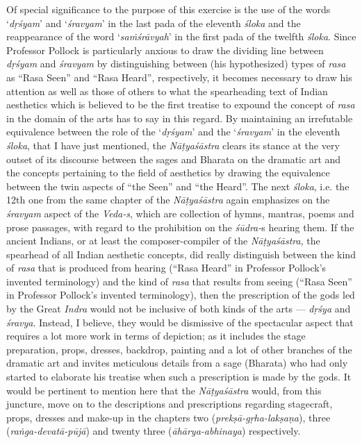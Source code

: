 Of special significance to the purpose of this exercise is the use of the words ‘\textsl{dṛśyam}’ and ‘\textsl{śravyam}’ in the last pada of the eleventh \textsl{śloka} and the reappearance of the word ‘\textsl{saṁśrāvyah}’ in the first pada of the twelfth \textsl{śloka}. Since Professor Pollock is particularly anxious to draw the dividing line between \textsl{dṛśyam} and \textsl{śravyam} by distinguishing between (his hypothesized) types of \textsl{rasa} as “Rasa Seen” and “Rasa Heard”, respectively, it becomes necessary to draw his attention as well as those of others to what the spearheading text of Indian aesthetics which is believed to be the first treatise to expound the concept of \textsl{rasa} in the domain of the arts has to say in this regard. By maintaining an irrefutable equivalence between the role of the ‘\textsl{dṛśyam}’ and the ‘\textsl{śravyam}’ in the eleventh \textsl{śloka}, that I have just mentioned, the \textsl{Nāṭyaśāstra} clears its stance at the very outset of its discourse between the sages and Bharata on the dramatic art and the concepts pertaining to the field of aesthetics by drawing the equivalence between the twin aspects of “the Seen” and “the Heard”. The next \textsl{śloka}, i.e. the 12th one from the same chapter of the \textsl{Nāṭyaśāstra} again emphasizes on the \textsl{śravyam} aspect of the \textsl{Veda-s}, which are collection of hymns, mantras, poems and prose passages, with regard to the prohibition on the \textsl{śūdra-}s hearing them. If the ancient Indians, or at least the composer-compiler of the \textsl{Nāṭyaśāstra}, the spearhead of all Indian aesthetic concepts, did really distinguish between the kind of \textsl{rasa} that is produced from hearing (“Rasa Heard” in Professor Pollock’s invented terminology) and the kind of \textsl{rasa} that results from seeing (“Rasa Seen” in Professor Pollock’s invented terminology), then the prescription of the gods led by the Great \textsl{Indra} would not be inclusive of both kinds of the arts --- \textsl{dṛśya} and \textsl{śravya}. Instead, I believe, they would be dismissive of the spectacular aspect that requires a lot more work in terms of depiction; as it includes the stage preparation, props, dresses, backdrop, painting and a lot of other branches of the dramatic art and invites meticulous details from a sage (Bharata) who had only started to elaborate his treatise when such a prescription is made by the gods. It would be pertinent to mention here that the \textsl{Nāṭyaśāstra} would, from this juncture, move on to the descriptions and prescriptions regarding stagecraft, props, dresses and make-up in the chapters two (\textsl{prekṣā-gṛha-lakṣaṇa}), three (\textsl{raṅga-devatā-pūjā}) and twenty three (\textsl{āhārya-abhinaya}) respectively. 

